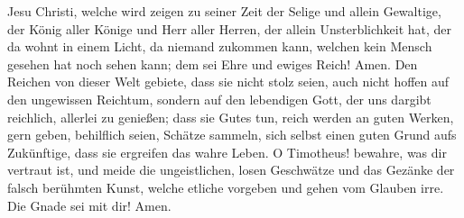 Jesu Christi,  welche wird zeigen zu seiner Zeit der
Selige und allein Gewaltige, der König aller Könige und Herr aller
Herren,  der allein Unsterblichkeit hat, der da wohnt in
einem Licht, da niemand zukommen kann, welchen kein Mensch gesehen hat
noch sehen kann; dem sei Ehre und ewiges Reich! Amen. 
Den Reichen von dieser Welt gebiete, dass sie nicht stolz seien, auch
nicht hoffen auf den ungewissen Reichtum, sondern auf den lebendigen
Gott, der uns dargibt reichlich, allerlei zu genießen; 
dass sie Gutes tun, reich werden an guten Werken, gern geben, behilflich
seien,  Schätze sammeln, sich selbst einen guten Grund
aufs Zukünftige, dass sie ergreifen das wahre Leben.  O
Timotheus! bewahre, was dir vertraut ist, und meide die ungeistlichen,
losen Geschwätze und das Gezänke der falsch berühmten Kunst,
 welche etliche vorgeben und gehen vom Glauben irre. Die
Gnade sei mit dir! Amen.
